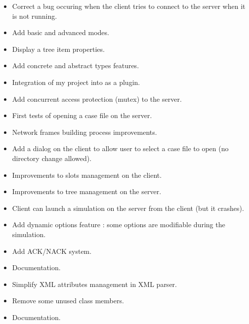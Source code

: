\begin{itemize}
 \item Correct a bug occuring when the client tries to connect to the server
when it is not running.
 \item Add basic and advanced modes.
 \item Display a tree item properties.
\end{itemize}

\begin{itemize}
 \item Add concrete and abstract types features.
 \item Integration of my project into \cf as a plugin.
 \item Add concurrent access protection (mutex) to the server.
 \item First tests of opening a case file on the server.
\end{itemize}

\begin{itemize}
 \item Network frames building process improvements.
 \item Add a dialog on the client to allow user to select a case file to open
(no directory change allowed).
 \item Improvements to slots management on the client.
 \item Improvements to tree management on the server.
 \item Client can launch a simulation on the server from the client (but it
crashes).
 \item Add dynamic options feature : some options are modifiable during the
simulation.
 \item Add ACK/NACK system.
 \item Documentation.
\end{itemize}

\begin{itemize}
 \item Simplify XML attributes management in XML parser.
 \item Remove some unused class members.
 \item Documentation.
\end{itemize}

